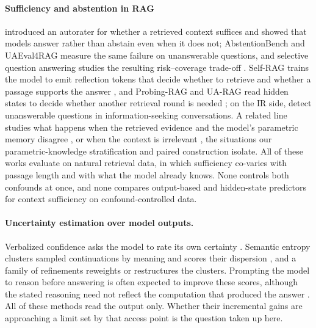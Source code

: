 \documentclass[acmsmall,screen,review]{acmart}
\begin{document}
\paragraph{Sufficiency and abstention in RAG}
\citet{joren2025sufficient} introduced an autorater for whether a retrieved context suffices and showed that models answer rather than abstain even when it does not; AbstentionBench \citep{kirichenko2025abstentionbench} and UAEval4RAG \citep{peng2025unanswerability} measure the same failure on unanswerable questions, and selective question answering studies the resulting risk--coverage trade-off \citep{kamath2020selective}. Self-RAG trains the model to emit reflection tokens that decide whether to retrieve and whether a passage supports the answer \citep{asai2024selfrag}, and Probing-RAG and UA-RAG read hidden states to decide whether another retrieval round is needed \citep{baek2025probingrad,niu2026uarag}; on the IR side, \citet{lajewska2024unanswerable} detect unanswerable questions in information-seeking conversations. A related line studies what happens when the retrieved evidence and the model's parametric memory disagree \citep{neeman2023disentqa,li2024conflictbank,zhao2025parametric}, or when the context is irrelevant \citep{shi2023distracted,yoran2024making}, the situations our parametric-knowledge stratification and paired construction isolate. All of these works evaluate on natural retrieval data, in which sufficiency co-varies with passage length and with what the model already knows. None controls both confounds at once, and none compares output-based and hidden-state predictors for context sufficiency on confound-controlled data.

\paragraph{Uncertainty estimation over model outputs.}
Verbalized confidence asks the model to rate its own certainty \citep{xiong2024llms}. Semantic entropy clusters sampled continuations by meaning and scores their dispersion \citep{farquhar2024semantic}, and a family of refinements reweights or restructures the clusters. Prompting the model to reason before answering is often expected to improve these scores, although the stated reasoning need not reflect the computation that produced the answer \citep{turpin2023unfaithful}. All of these methods read the output only. Whether their incremental gains are approaching a limit set by that access point is the question taken up here.
\end{document}
